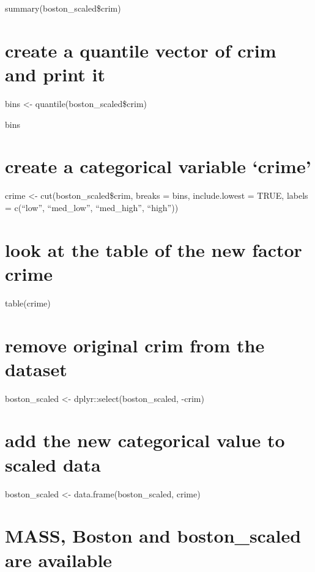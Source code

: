 \documentclass[]{article}
\begin{document}
summary(boston\_scaled\$crim)

\section{create a quantile vector of crim and print
it}\label{create-a-quantile-vector-of-crim-and-print-it}

bins \textless{}- quantile(boston\_scaled\$crim)

bins

\section{\texorpdfstring{create a categorical variable
`crime'}{create a categorical variable crime}}\label{create-a-categorical-variable-crime}

crime \textless{}- cut(boston\_scaled\$crim, breaks = bins,
include.lowest = TRUE, labels = c(``low'', ``med\_low'', ``med\_high'',
``high''))

\section{look at the table of the new factor
crime}\label{look-at-the-table-of-the-new-factor-crime}

table(crime)

\section{remove original crim from the
dataset}\label{remove-original-crim-from-the-dataset}

boston\_scaled \textless{}- dplyr::select(boston\_scaled, -crim)

\section{add the new categorical value to scaled
data}\label{add-the-new-categorical-value-to-scaled-data}

boston\_scaled \textless{}- data.frame(boston\_scaled, crime)

\section{MASS, Boston and boston\_scaled are
available}\label{mass-boston-and-boston_scaled-are-available-1}

\begin{quote}
\end{quote}
\end{document}
